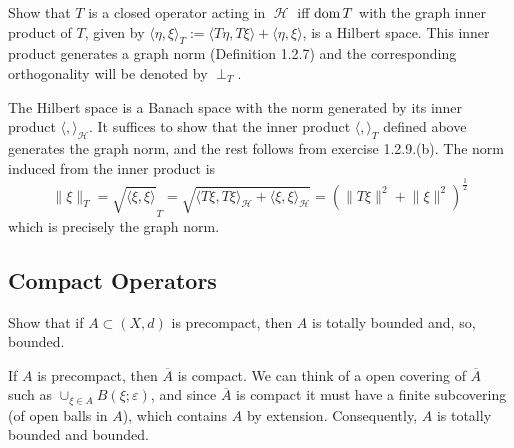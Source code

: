 \documentclass{article}
\theoremstyle{exercisestyle}
\newenvironment{exercise}[1]
  {\renewcommand\theinnerex{#1}\innerex}
  {\endinnerex}
\newcommand{\norm}[1]{\lVert #1 \rVert}
\newcommand{\closure}[1]{\overline{ #1}}
\newcommand{\inner}[2]{\langle #1, #2 \rangle}
\newcommand{\openball}[2]{B\left(#1;#2\right)}
\DeclareMathOperator{\hilbert}{\mathcal{H}}
\begin{document}
\begin{exercise}{1.2.28}
    Show that $T$ is a closed operator acting in $\hilbert$ iff $\operatorname{dom} T$ with the graph inner product of $T$, given by
    $\inner{\eta}{\xi}_T := \inner{T\eta}{T\xi} + \inner{\eta}{\xi}$, is a Hilbert space.
    This inner product generates a graph norm (Definition 1.2.7) and the corresponding orthogonality will be denoted by $\perp_T$.

    The Hilbert space is a Banach space with the norm generated by its inner product $\langle , \rangle_{\hilbert}$.
    It suffices to show that the inner product $\langle , \rangle_T$ defined above generates the graph norm, and the rest follows from exercise 1.2.9.(b).
    The norm induced from the inner product is
    $$\norm{\xi}_T = \sqrt{\inner{\xi}{\xi}}_T = \sqrt{\inner{T\xi}{T\xi}_{\hilbert} + \inner{\xi}{\xi}_{\hilbert}}= \left(\norm{T\xi}^2 + \norm{\xi}^2\right)^{\frac{1}{2}}$$
    which is precisely the graph norm.

\end{exercise}

\subsection{Compact Operators}

\begin{exercise}{1.3.1}
    Show that if $A \subset (X, d)$ is precompact, then $A$ is totally bounded and, so, bounded.

    If $A$ is precompact, then $\closure{A}$ is compact. We can think of a open covering of $\closure{A}$ such as $\cup_{\xi \in A} \openball{\xi}{\varepsilon}$,
    and since $\closure{A}$ is compact it must have a finite subcovering (of open balls in $A$), which contains $A$ by extension. Consequently, $A$ is totally bounded and bounded.

\end{exercise}
\end{document}
